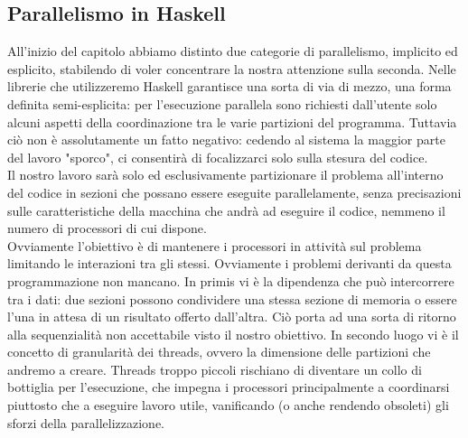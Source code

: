 \subsection{Parallelismo in Haskell}
All'inizio del capitolo abbiamo distinto due categorie di parallelismo, implicito ed esplicito, stabilendo di voler concentrare la nostra attenzione sulla seconda. Nelle librerie che utilizzeremo Haskell garantisce una sorta di via di mezzo, una forma definita semi-esplicita: per l'esecuzione parallela sono richiesti dall'utente solo alcuni aspetti della coordinazione tra le varie partizioni del programma. Tuttavia ciò non è assolutamente un fatto negativo: cedendo al sistema la maggior parte del lavoro "sporco", ci consentirà di focalizzarci solo sulla stesura del codice.\\
Il nostro lavoro sarà solo ed esclusivamente partizionare il problema all'interno del codice in sezioni che possano essere eseguite parallelamente, senza precisazioni sulle caratteristiche della macchina che andrà ad eseguire il codice, nemmeno il numero di processori di cui dispone.\\
Ovviamente l'obiettivo è di mantenere i processori in attività sul problema limitando le interazioni tra gli stessi. Ovviamente i problemi derivanti da questa programmazione non mancano. In primis vi è la dipendenza che può intercorrere tra i dati: due sezioni possono condividere una stessa sezione di memoria o essere l'una in attesa di un risultato offerto dall'altra. Ciò porta ad una sorta di ritorno alla sequenzialità non accettabile visto il nostro obiettivo. In secondo luogo vi è il concetto di granularità dei threads, ovvero la dimensione delle partizioni che andremo a creare. Threads troppo piccoli rischiano di diventare un collo di bottiglia per l'esecuzione, che impegna i processori principalmente a coordinarsi piuttosto che a eseguire lavoro utile, vanificando (o anche rendendo obsoleti) gli sforzi della parallelizzazione.
